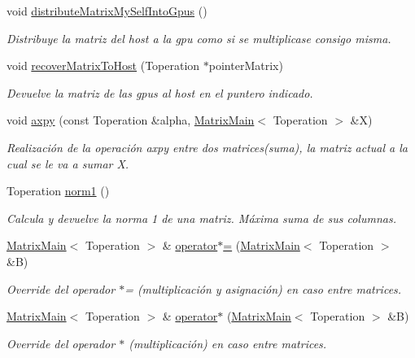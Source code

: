 \begin{DoxyCompactItemize}
\mbox{\label{classMatrixMain_a7e4ecdca5f601c0f2a05a6cafc9eea18}} 
void \hyperlink{classMatrixMain_a7e4ecdca5f601c0f2a05a6cafc9eea18}{distribute\+Matrix\+My\+Self\+Into\+Gpus} ()
\begin{DoxyCompactList}\small\item\em Distribuye la matriz del host a la gpu como si se multiplicase consigo misma. \end{DoxyCompactList}\item 
void \hyperlink{classMatrixMain_ac7b3657c7ce39feb11815971d2ec1382}{recover\+Matrix\+To\+Host} (Toperation $\ast$pointer\+Matrix)
\begin{DoxyCompactList}\small\item\em Devuelve la matriz de las gpus al host en el puntero indicado. \end{DoxyCompactList}\item 
void \hyperlink{classMatrixMain_af9debccd89809647c28ad214434aaebb}{axpy} (const Toperation \&alpha, \hyperlink{classMatrixMain}{Matrix\+Main}$<$ Toperation $>$ \&X)
\begin{DoxyCompactList}\small\item\em Realización de la operación axpy entre dos matrices(suma), la matriz actual a la cual se le va a sumar X. \end{DoxyCompactList}\item 
Toperation \hyperlink{classMatrixMain_ad78ea69222a13a6ef322573b82427787}{norm1} ()
\begin{DoxyCompactList}\small\item\em Calcula y devuelve la norma 1 de una matriz. Máxima suma de sus columnas. \end{DoxyCompactList}\item 
\hyperlink{classMatrixMain}{Matrix\+Main}$<$ Toperation $>$ \& \hyperlink{classMatrixMain_a5dcca620fc49b59d8aaf1171b6b0ba6f}{operator$\ast$=} (\hyperlink{classMatrixMain}{Matrix\+Main}$<$ Toperation $>$ \&B)
\begin{DoxyCompactList}\small\item\em Override del operador $\ast$= (multiplicación y asignación) en caso entre matrices. \end{DoxyCompactList}\item 
\hyperlink{classMatrixMain}{Matrix\+Main}$<$ Toperation $>$ \& \hyperlink{classMatrixMain_a89bb905f0b2d52709331ff0e3ec6733b}{operator$\ast$} (\hyperlink{classMatrixMain}{Matrix\+Main}$<$ Toperation $>$ \&B)
\begin{DoxyCompactList}\small\item\em Override del operador $\ast$ (multiplicación) en caso entre matrices. \end{DoxyCompactList}\item 

\end{DoxyCompactItemize}
